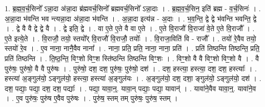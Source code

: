 \documentclass[17pt]{extarticle}
\begin{document}
1. ब्र॒ह्म॒व॒र्च॒सिनो᳚ ऽन्ना॒दा अ॑न्ना॒दा ब्र॑ह्मवर्च॒सिनो᳚ ब्रह्मवर्च॒सिनो᳚ ऽन्ना॒दाः । . ब्र॒ह्म॒व॒र्च॒सिन॒ इति॑ ब्रह्म - व॒र्च॒सिनः॑ । . अ॒न्ना॒दा भ॑वन्ति भव न्त्यन्ना॒दा अ॑न्ना॒दा भ॑वन्ति । . अ॒न्ना॒दा इत्य॑न्न - अ॒दाः । . भ॒व॒न्ति॒ द्वे द्वे भ॑वन्ति भवन्ति॒ द्वे । . द्वे वै वै द्वे द्वे वै । . द्वे इति॒ द्वे । . वा ए॒ते ए॒ते वै वा ए॒ते । . ए॒ते वि॒राजौ॑ वि॒राजा॑ वे॒ते ए॒ते वि॒राजौ᳚ । . ए॒ते इत्ये॒ते । . वि॒राजौ॒ तयो॒ स्तयो᳚र् वि॒राजौ॑ वि॒राजौ॒ तयोः᳚ । . वि॒राजा॒विति॑ वि - राजौ᳚ । . तयो॑ रे॒वैव तयो॒ स्तयो॑ रे॒व । . ए॒व नाना॒ नानै॒वैव नाना᳚ । . नाना॒ प्रति॒ प्रति॒ नाना॒ नाना॒ प्रति॑ । . प्रति॑ तिष्ठन्ति तिष्ठन्ति॒ प्रति॒ प्रति॑ तिष्ठन्ति । . ति॒ष्ठ॒न्ति॒ विꣳ॒॒शो विꣳ॒॒श स्ति॑ष्ठन्ति तिष्ठन्ति विꣳ॒॒शः । . विꣳ॒॒शो वै वै विꣳ॒॒शो विꣳ॒॒शो वै । . वै पुरु॑षः॒ पुरु॑षो॒ वै वै पुरु॑षः । . पुरु॑षो॒ दश॒ दश॒ पुरु॑षः॒ पुरु॑षो॒ दश॑ । . दश॒ हस्त्या॒ हस्त्या॒ दश॒ दश॒ हस्त्याः᳚ । . हस्त्या॑ अ॒ङ्गुल॑यो॒ ऽङ्गुल॑यो॒ हस्त्या॒ हस्त्या॑ अ॒ङ्गुल॑यः । . अ॒ङ्गुल॑यो॒ दश॒ दशा॒ ङ्गुल॑यो॒ ऽङ्गुल॑यो॒ दश॑ । . दश॒ पद्याः॒ पद्या॒ दश॒ दश॒ पद्याः᳚ । . पद्या॒ यावा॒न्॒. यावा॒न् पद्याः॒ पद्या॒ यावान्॑ । . यावा॑ने॒वैव यावा॒न्॒. यावा॑ने॒व । . ए॒व पुरु॑षः॒ पुरु॑ष ए॒वैव पुरु॑षः । . पुरु॑ष॒ स्तम् तम् पुरु॑षः॒ पुरु॑ष॒ स्तम् । \newline
\end{document}

